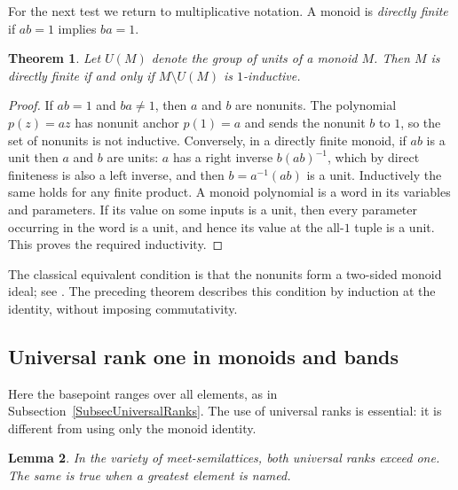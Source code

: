 \documentclass[12pt,english]{amsart}
\newtheorem{theorem}{Theorem}[section]
\newtheorem{lemma}[theorem]{Lemma}
\theoremstyle{definition}
\numberwithin{equation}{section}
\theoremstyle{remark}
\begin{document}
For the next test we return to multiplicative notation. A monoid is
\emph{directly finite} if $ab=1$ implies $ba=1$.

\begin{theorem}\label{ThmDetectDirectFinite}
Let $U(M)$ denote the group of units of a monoid $M$. Then $M$ is
directly finite if and only if $M\setminus U(M)$ is $1$-inductive.
\end{theorem}

\begin{proof}
If $ab=1$ and $ba\ne1$, then $a$ and $b$ are nonunits. The polynomial
$p(z)=az$ has nonunit anchor $p(1)=a$ and sends the nonunit $b$ to
$1$, so the set of nonunits is not inductive.
Conversely, in a directly finite monoid, if $ab$ is a unit then
$a$ and $b$ are units: $a$ has a right inverse $b(ab)^{-1}$, which
by direct finiteness is also a left inverse, and then
$b=a^{-1}(ab)$ is a unit. Inductively the same holds for any finite
product. A monoid polynomial is a word in its variables and
parameters. If its value on some inputs is a unit, then every
parameter occurring in the word is a unit, and hence its value at
the all-$1$ tuple is a unit. This proves the required inductivity.
\end{proof}

The classical equivalent condition is that the nonunits form a
two-sided monoid ideal; see \cite[Lemma 2]{DetCR22}. The preceding
theorem describes this condition by induction at the identity,
without imposing commutativity.

\subsection{Universal rank one in monoids and bands}\label{SubsecDetectMonoidRanks}

Here the basepoint ranges over all elements, as in
Subsection~\ref{SubsecUniversalRanks}. The use of universal ranks is
essential: it is different from using only the monoid identity.

\begin{lemma}\label{LemDetectSemilatticeObstructions}
In the variety of meet-semilattices, both universal ranks exceed
one. The same is true when a greatest element is named.
\end{lemma}
\end{document}
